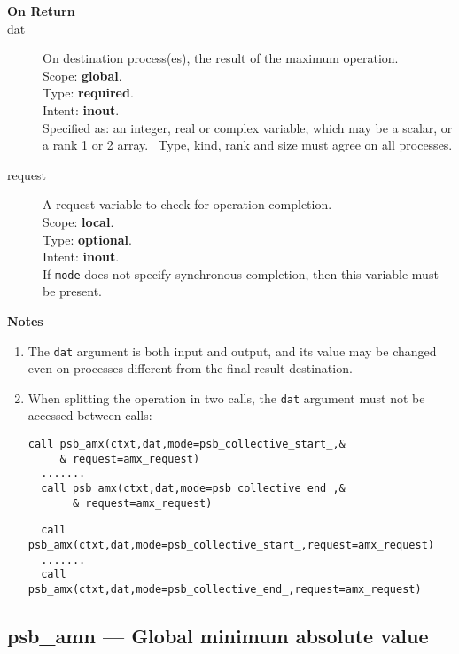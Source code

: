 \begin{description}
\item[\bf On Return]
\item[dat] On destination process(es), the result of the maximum operation.\\
Scope: {\bf global}.\\
Type: {\bf required}.\\
Intent: {\bf inout}.\\
Specified as: an integer, real or complex variable, which may be a
scalar, or a rank 1 or 2 array. \
Type, kind, rank and size must agree on all processes.
\item[request] A request variable to check for operation completion.\\
Scope: {\bf local}.\\
Type: {\bf optional}.\\
Intent: {\bf inout}.\\
If \verb|mode| does not specify synchronous completion, then this
variable must be present.
\end{description}


{\par\noindent\large\bfseries Notes}
\begin{enumerate}
\item The \verb|dat| argument is both input and output, and its
  value may be changed even on processes different from the final
  result destination.
\item When splitting the operation in two calls, the \verb|dat|
  argument  must not be accessed between calls:
\ifpdf
\begin{verbatim}
call psb_amx(ctxt,dat,mode=psb_collective_start_,&
     & request=amx_request)
  .......
  call psb_amx(ctxt,dat,mode=psb_collective_end_,&
       & request=amx_request)
\end{verbatim}
\else
\begin{center}
    \begin{minipage}[tl]{0.9\textwidth}
\begin{verbatim} 
  call psb_amx(ctxt,dat,mode=psb_collective_start_,request=amx_request)
  .......
  call psb_amx(ctxt,dat,mode=psb_collective_end_,request=amx_request)
\end{verbatim}
    \end{minipage}
  \end{center}
\fi
\end{enumerate}

\clearpage\subsection{psb\_amn --- Global minimum absolute value}

